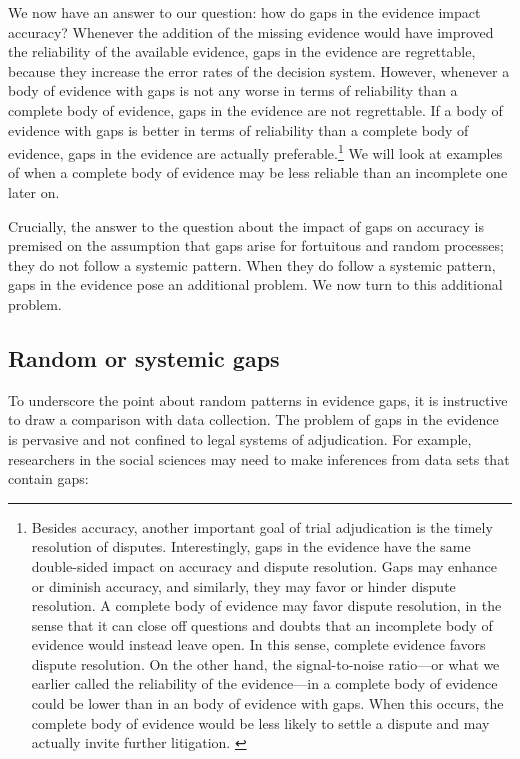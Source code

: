 \documentclass[
  10pt,
  dvipsnames,enabledeprecatedfontcommands]{scrartcl}
\begin{document}
We now have an answer to our question: how do gaps in the evidence
impact accuracy? Whenever the addition of the missing evidence would
have improved the reliability of the available evidence, gaps in the
evidence are regrettable, because they increase the error rates of the
decision system. However, whenever a body of evidence with gaps is not
any worse in terms of reliability than a complete body of evidence, gaps
in the evidence are not regrettable. If a body of evidence with gaps is
better in terms of reliability than a complete body of evidence, gaps in
the evidence are actually preferable.\footnote{Besides accuracy, another
  important goal of trial adjudication is the timely resolution of
  disputes. Interestingly, gaps in the evidence have the same
  double-sided impact on accuracy and dispute resolution. Gaps may
  enhance or diminish accuracy, and similarly, they may favor or hinder
  dispute resolution. A complete body of evidence may favor dispute
  resolution, in the sense that it can close off questions and doubts
  that an incomplete body of evidence would instead leave open. In this
  sense, complete evidence favors dispute resolution. On the other hand,
  the signal-to-noise ratio---or what we earlier called the reliability
  of the evidence---in a complete body of evidence could be lower than
  in an body of evidence with gaps. When this occurs, the complete body
  of evidence would be less likely to settle a dispute and may actually
  invite further litigation. \label{footnote:dispute-resolution}} We
will look at examples of when a complete body of evidence may be less
reliable than an incomplete one later on.

Crucially, the answer to the question about the impact of gaps on
accuracy is premised on the assumption that gaps arise for fortuitous
and random processes; they do not follow a systemic pattern. When they
do follow a systemic pattern, gaps in the evidence pose an additional
problem. We now turn to this additional problem.

\hypertarget{random-or-systemic-gaps}{%
\subsection{Random or systemic gaps}\label{random-or-systemic-gaps}}

To underscore the point about random patterns in evidence gaps, it is
instructive to draw a comparison with data collection. The problem of
gaps in the evidence is pervasive and not confined to legal systems of
adjudication. For example, researchers in the social sciences may need
to make inferences from data sets that contain gaps:
\end{document}
